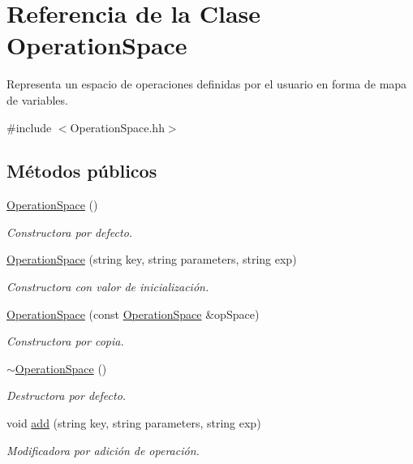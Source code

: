 \hypertarget{class_operation_space}{}\section{Referencia de la Clase Operation\+Space}
\label{class_operation_space}


Representa un espacio de operaciones definidas por el usuario en forma de mapa de variables.  




{\ttfamily \#include $<$Operation\+Space.\+hh$>$}

\subsection*{Métodos públicos}
\begin{DoxyCompactItemize}
\item 
\hyperlink{class_operation_space_a7e3b8f0bede707cc77038ace8152d00f}{Operation\+Space} ()
\begin{DoxyCompactList}\small\item\em Constructora por defecto. \end{DoxyCompactList}\item 
\hyperlink{class_operation_space_ad19304f11edf1937b8f9a75957cd3340}{Operation\+Space} (string key, string parameters, string exp)
\begin{DoxyCompactList}\small\item\em Constructora con valor de inicialización. \end{DoxyCompactList}\item 
\hyperlink{class_operation_space_ab9bfa4eb9ba0e11fd6d8237464d03ebc}{Operation\+Space} (const \hyperlink{class_operation_space}{Operation\+Space} \&op\+Space)
\begin{DoxyCompactList}\small\item\em Constructora por copia. \end{DoxyCompactList}\item 
\hyperlink{class_operation_space_a5312b628b76702ca0fb82eb925b9999d}{$\sim$\+Operation\+Space} ()
\begin{DoxyCompactList}\small\item\em Destructora por defecto. \end{DoxyCompactList}\item 
void \hyperlink{class_operation_space_a9892f828928c1541a61f7d04b2d0187a}{add} (string key, string parameters, string exp)
\begin{DoxyCompactList}\small\item\em Modificadora por adición de operación. \end{DoxyCompactList}\item 

\end{DoxyCompactItemize}
